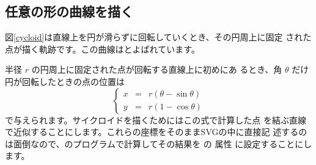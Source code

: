 \subsection{任意の形の曲線を描く}\label{SVGwithJavascript}
図\ref{cycloid}は直線上を円が滑らずに回転していくとき、その円周上に固定
された点が描く軌跡です。この曲線はとよばれています。

半径 $r$ の円周上に固定された点が回転する直線上に初めにあ
るとき、角 $\theta$ だけ円が回転したときの点の位置は
\begin{equation}
\left\{
\begin{array}{rcl}
 x &=& r(\theta-\sin\theta)\\
 y &=& r(1-\cos\theta)
\end{array}\label{cycloid-formula}
\right.
\end{equation}
で与えられます。サイクロイドを描くためにはこの式で計算した点
を結ぶ直線で近似することにします。これらの座標をそのままSVGの中に直接記
述するのは面倒なので、\JS のプログラムで計算してその結果を の
属性 に設定することにします。

